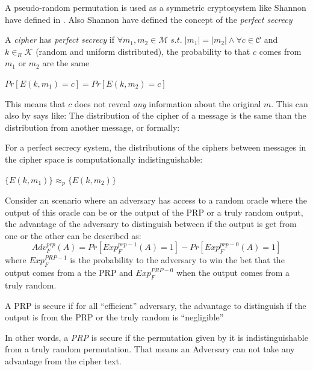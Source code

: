 \documentclass[10pt,a4paper,twoside]{llncs}
\begin{document}
A pseudo-random permutation is used as a symmetric cryptosystem like Shannon have defined in \cite{shannon-comTheorySecSys}. Also Shannon have defined the concept of the \emph{perfect secrecy}
\begin{definition}
 A \emph{cipher} has \emph{perfect secrecy} if $\forall m_1, m_2 \in \mathcal{M} \;s.t.\; \left| m_1 \right| = \left| m_2 \right| \wedge \forall c \in \mathcal{C}$ and  $k\in_R\mathcal{K}$ (random and uniform distributed), the probability to that $c$ comes from $m_1$ or $m_2$ are the same
 \begin{center}
  $Pr[E(k,m_1)=c] = Pr[E(k,m_2)=c]$
 \end{center}
\end{definition}

This means that $c$ does not reveal \emph{any} information about the original $m$. This can also by says like: The distribution of the cipher of a message is the same than the distribution from another message, or formally:
\begin{definition}
 For a perfect secrecy system, the distributions of the ciphers between messages in the cipher space is computationally indistinguishable:
 \begin{center}
  $\{ E(k,m_1) \} \approx_p \{ E(k,m_2) \} $
 \end{center}
\end{definition}

Consider an scenario where an adversary has access to a random oracle where the output of this oracle can be or the output of the PRP or a truly random output, the advantage of the adversary to distinguish between if the output is get from one or the other can be described as:
\begin{equation}\label{eq:prpAdv}
 {Adv}_{F}^{prp}(A) = Pr[{Exp}_{F}^{prp-1}(A)=1]-Pr[{Exp}_{F}^{prp-0}(A)=1]
\end{equation}
where ${Exp}_{F}^{PRP-1}$ is the probability to the adversary to win the bet that the output comes from a the PRP and ${Exp}_{F}^{PRP-0}$ when the output comes from a truly random.

\begin{definition}\label{def:securePRP}
 A PRP is secure if for all ``efficient'' adversary, the advantage to distinguish if the output is from the PRP or the truly random is ``negligible''
\end{definition}

In other words, a \emph{PRP} is secure if the permutation given by it is indistinguishable from a truly random permutation. That means an Adversary can not take any advantage from the cipher text.
\end{document}
